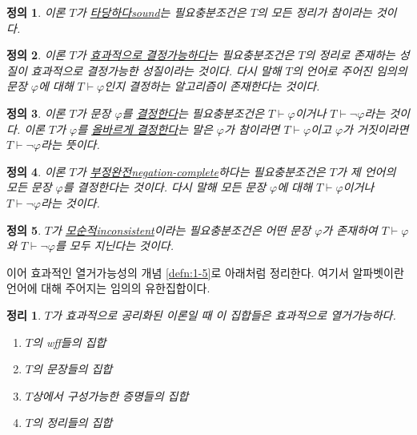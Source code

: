 \documentclass[a4paper,chapter,atbegshi]{oblivoir}
\newtheorem{defn}{정의}[chapter]
\newtheorem{theo}{정리}[chapter]
\begin{document}
\begin{defn}\label{defn:1-9}
  이론 $T$가 \underline{타당하다\tiny sound}는 필요충분조건은 $T$의 모든 정리가
  참이라는 것이다.
\end{defn}
\begin{defn}\label{defn:1-10}
  이론 $T$가 \underline{효과적으로 결정가능하다}는 필요충분조건은 $T$의 정리로
  존재하는 성질이 효과적으로 결정가능한 성질이라는 것이다. 다시 말해
  $T$의 언어로 주어진 임의의 문장 $\varphi$에 대해 $T\vdash\varphi$인지 결정하는
  알고리즘이 존재한다는 것이다.
\end{defn}
\begin{defn}\label{defn:1-11}
  이론 $T$가 문장 $\varphi$를 \underline{결정한다}는 필요충분조건은 
  $T\vdash\varphi$이거나 $T\vdash\neg\varphi$라는 것이다. 이론 $T$가
  $\varphi$를 \underline{올바르게 결정한다}는 말은 $\varphi$가 참이라면
  $T\vdash\varphi$이고 $\varphi$가 거짓이라면 $T\vdash\neg\varphi$라는 뜻이다.
\end{defn}
\begin{defn}\label{defn:1-12}
  이론 $T$가 \underline{부정완전\tiny negation-complete}하다는 필요충분조건은
  $T$가 제 언어의 모든 문장 $\varphi$를 결정한다는 것이다. 다시 말해 모든 문장
  $\varphi$에 대해 $T\vdash\varphi$이거나 $T\vdash\neg\varphi$라는 것이다.
\end{defn}
\begin{defn}\label{defn:1-13}
  $T$가 \underline{모순적\tiny inconsistent}이라는 필요충분조건은 어떤 문장
  $\varphi$가 존재하여 $T\vdash\varphi$와 $T\vdash\neg\varphi$를 모두 지닌다는
  것이다.
\end{defn}
이어 효과적인 열거가능성의 개념 \ref{defn:1-5}로 아래처럼 정리한다. 여기서
알파벳이란 언어에 대해 주어지는 임의의 유한집합이다.
\begin{theo}\label{theo:1-12}
  $T$가 효과적으로 공리화된 이론일 때 이 집합들은 효과적으로 열거가능하다.
  \begin{enumerate}
    \item $T$의 wff들의 집합
    \item $T$의 문장들의 집합
    \item $T$상에서 구성가능한 증명들의 집합
    \item $T$의 정리들의 집합 
  \end{enumerate}
\end{theo}
\end{document}

